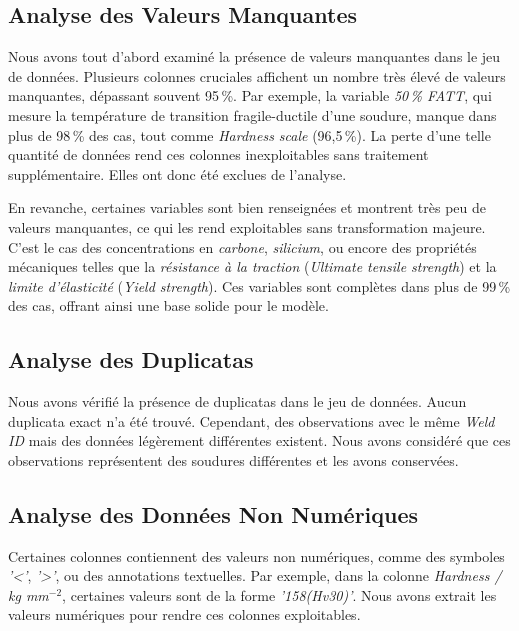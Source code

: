 \documentclass{article}
\begin{document}
\subsection{Analyse des Valeurs Manquantes}

Nous avons tout d'abord examiné la présence de valeurs manquantes dans le jeu de données. Plusieurs colonnes cruciales affichent un nombre très élevé de valeurs manquantes, dépassant souvent 95\,\%. Par exemple, la variable \textit{50\,\% FATT}, qui mesure la température de transition fragile-ductile d'une soudure, manque dans plus de 98\,\% des cas, tout comme \textit{Hardness scale} (96,5\,\%). La perte d'une telle quantité de données rend ces colonnes inexploitables sans traitement supplémentaire. Elles ont donc été exclues de l'analyse.

En revanche, certaines variables sont bien renseignées et montrent très peu de valeurs manquantes, ce qui les rend exploitables sans transformation majeure. C'est le cas des concentrations en \textit{carbone}, \textit{silicium}, ou encore des propriétés mécaniques telles que la \textit{résistance à la traction} (\textit{Ultimate tensile strength}) et la \textit{limite d'élasticité} (\textit{Yield strength}). Ces variables sont complètes dans plus de 99\,\% des cas, offrant ainsi une base solide pour le modèle.

\subsection{Analyse des Duplicatas}

Nous avons vérifié la présence de duplicatas dans le jeu de données. Aucun duplicata exact n'a été trouvé. Cependant, des observations avec le même \textit{Weld ID} mais des données légèrement différentes existent. Nous avons considéré que ces observations représentent des soudures différentes et les avons conservées.

\subsection{Analyse des Données Non Numériques}

Certaines colonnes contiennent des valeurs non numériques, comme des symboles \textit{'<'}, \textit{'>'}, ou des annotations textuelles. Par exemple, dans la colonne \textit{Hardness / kg mm$^{-2}$}, certaines valeurs sont de la forme \textit{'158(Hv30)'}. Nous avons extrait les valeurs numériques pour rendre ces colonnes exploitables.
\end{document}
